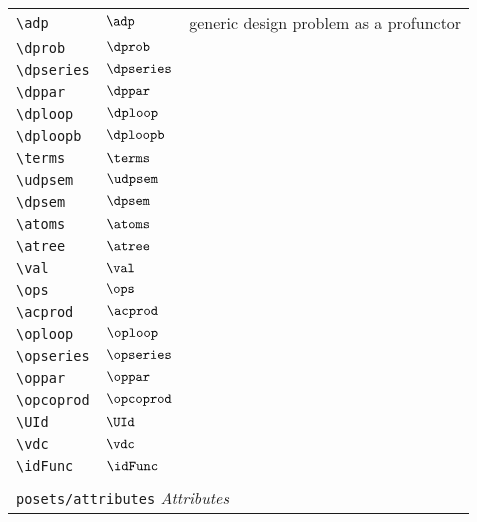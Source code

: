 \begin{longtable}{lll}
 \hline
{\color[rgb]{0.5,0.5,0.5}\texttt{\textbackslash adp}} & $\adp$ &  generic design problem as a profunctor\\ 
 {\color[rgb]{0.5,0.5,0.5}\texttt{\textbackslash dprob}} & $\dprob$ & \\ 
 {\color[rgb]{0.5,0.5,0.5}\texttt{\textbackslash dpseries}} & $\dpseries$ & \\ 
 {\color[rgb]{0.5,0.5,0.5}\texttt{\textbackslash dppar}} & $\dppar$ & \\ 
 {\color[rgb]{0.5,0.5,0.5}\texttt{\textbackslash dploop}} & $\dploop$ & \\ 
 {\color[rgb]{0.5,0.5,0.5}\texttt{\textbackslash dploopb}} & $\dploopb$ & \\ 
 {\color[rgb]{0.5,0.5,0.5}\texttt{\textbackslash terms}} & $\terms$ & \\ 
 {\color[rgb]{0.5,0.5,0.5}\texttt{\textbackslash udpsem}} & $\udpsem$ & \\ 
 {\color[rgb]{0.5,0.5,0.5}\texttt{\textbackslash dpsem}} & $\dpsem$ & \\ 
 {\color[rgb]{0.5,0.5,0.5}\texttt{\textbackslash atoms}} & $\atoms$ & \\ 
 {\color[rgb]{0.5,0.5,0.5}\texttt{\textbackslash atree}} & $\atree$ & \\ 
 {\color[rgb]{0.5,0.5,0.5}\texttt{\textbackslash val}} & $\val$ & \\ 
 {\color[rgb]{0.5,0.5,0.5}\texttt{\textbackslash ops}} & $\ops$ & \\ 
 {\color[rgb]{0.5,0.5,0.5}\texttt{\textbackslash acprod}} & $\acprod$ & \\ 
 {\color[rgb]{0.5,0.5,0.5}\texttt{\textbackslash oploop}} & $\oploop$ & \\ 
 {\color[rgb]{0.5,0.5,0.5}\texttt{\textbackslash opseries}} & $\opseries$ & \\ 
 {\color[rgb]{0.5,0.5,0.5}\texttt{\textbackslash oppar}} & $\oppar$ & \\ 
 {\color[rgb]{0.5,0.5,0.5}\texttt{\textbackslash opcoprod}} & $\opcoprod$ & \\ 
 {\color[rgb]{0.5,0.5,0.5}\texttt{\textbackslash UId}} & $\UId$ & \\ 
 {\color[rgb]{0.5,0.5,0.5}\texttt{\textbackslash vdc}} & $\vdc$ & \\ 
 {\color[rgb]{0.5,0.5,0.5}\texttt{\textbackslash idFunc}} & $\idFunc$ & \\ 
  &  & \\ 
 \multicolumn{3}{l}{{\color[rgb]{0.5,0.5,0.5}\texttt{posets/attributes}} \emph{Attributes}}\\ 

\end{longtable}
